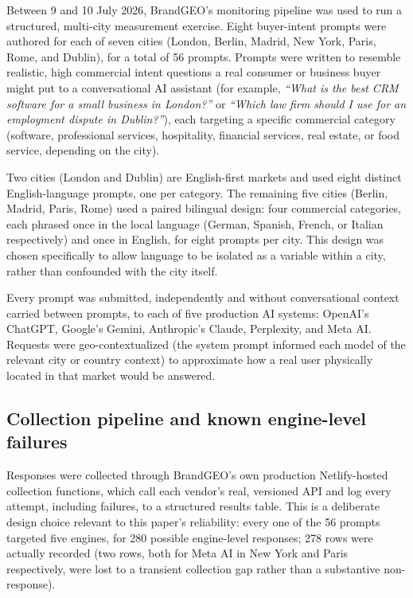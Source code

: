 \documentclass[11pt]{article}
\begin{document}
Between 9 and 10 July 2026, BrandGEO's monitoring pipeline was used to run a structured,
multi-city measurement exercise. Eight buyer-intent prompts were authored for each of
seven cities (London, Berlin, Madrid, New York, Paris, Rome, and Dublin), for a total
of 56 prompts. Prompts were written to resemble realistic, high commercial intent
questions a real consumer or business buyer might put to a conversational AI assistant
(for example, \textit{``What is the best CRM software for a small business in London?''}
or \textit{``Which law firm should I use for an employment dispute in Dublin?''}), each
targeting a specific commercial category (software, professional services, hospitality,
financial services, real estate, or food service, depending on the city).

Two cities (London and Dublin) are English-first markets and used eight distinct
English-language prompts, one per category. The remaining five cities (Berlin, Madrid,
Paris, Rome) used a paired bilingual design: four commercial categories, each phrased
once in the local language (German, Spanish, French, or Italian respectively) and once
in English, for eight prompts per city. This design was chosen specifically to allow
language to be isolated as a variable within a city, rather than confounded with the
city itself.

Every prompt was submitted, independently and without conversational context carried
between prompts, to each of five production AI systems: OpenAI's ChatGPT, Google's
Gemini, Anthropic's Claude, Perplexity, and Meta AI. Requests were geo-contextualized
(the system prompt informed each model of the relevant city or country context) to
approximate how a real user physically located in that market would be answered.

\subsection{Collection pipeline and known engine-level failures}

Responses were collected through BrandGEO's own production Netlify-hosted collection
functions, which call each vendor's real, versioned API and log every attempt, including
failures, to a structured results table. This is a deliberate design choice relevant to
this paper's reliability: every one of the 56 prompts targeted five engines, for 280
possible engine-level responses; 278 rows were actually recorded (two rows, both for
Meta AI in New York and Paris respectively, were lost to a transient collection gap
rather than a substantive non-response).
\end{document}
